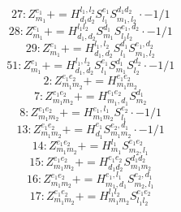 \documentclass[letterpaper,10pt,fleqn,leqno,onecolumn]{article}
\begin{document}
\begin{equation} \;\;\;\;\;\;  27: Z^{e_{1}}_{m_{1}}+=H^{l_{1},l_{2}}_{d_{1}d_{2}}S^{e_{1}}_{l_{1}}S^{d_{1}d_{2}}_{m_{1},l_{2}}\cdot -1/1 \end{equation}
\begin{equation} \;\;\;\;\;\;  28: Z^{e_{1}}_{m_{1}}+=H^{l_{1}l_{2}}_{d_{1},d_{2}}S^{d_{1}}_{m_{1}}S^{e_{1},d_{2}}_{l_{1}l_{2}}\cdot -1/1 \end{equation}
\begin{equation} \;\;\;\;\;\;  29: Z^{e_{1}}_{m_{1}}+=H^{l_{1},l_{2}}_{d_{1},d_{2}}S^{d_{1}}_{l_{1}}S^{e_{1},d_{2}}_{m_{1},l_{2}} \end{equation}
\begin{equation} \;\;\;\;\;\;  51: Z^{e_{1}}_{m_{1}}+=H^{l_{1},l_{2}}_{d_{1},d_{2}}S^{e_{1}}_{l_{1}}S^{d_{1}}_{m_{1}}S^{d_{2}}_{l_{2}}\cdot -1/1 \end{equation}
\begin{equation} \;\;\;\;\;\;  2: Z^{e_{1}e_{2}}_{m_{1}m_{2}}+=H^{e_{1}e_{2}}_{m_{1}m_{2}} \end{equation}
\begin{equation} \;\;\;\;\;\;  7: Z^{e_{1}e_{2}}_{m_{1}m_{2}}+=H^{e_{1}e_{2}}_{m_{1},d_{1}}S^{d_{1}}_{m_{2}} \end{equation}
\begin{equation} \;\;\;\;\;\;  8: Z^{e_{1}e_{2}}_{m_{1}m_{2}}+=H^{e_{1},l_{1}}_{m_{1}m_{2}}S^{e_{2}}_{l_{1}}\cdot -1/1 \end{equation}
\begin{equation} \;\;\;\;\;\;  13: Z^{e_{1}e_{2}}_{m_{1}m_{2}}+=H^{e_{1}}_{d_{1}}S^{e_{2},d_{1}}_{m_{1}m_{2}}\cdot -1/1 \end{equation}
\begin{equation} \;\;\;\;\;\;  14: Z^{e_{1}e_{2}}_{m_{1}m_{2}}+=H^{l_{1}}_{m_{1}}S^{e_{1}e_{2}}_{m_{2},l_{1}} \end{equation}
\begin{equation} \;\;\;\;\;\;  15: Z^{e_{1}e_{2}}_{m_{1}m_{2}}+=H^{e_{1}e_{2}}_{d_{1}d_{2}}S^{d_{1}d_{2}}_{m_{1}m_{2}} \end{equation}
\begin{equation} \;\;\;\;\;\;  16: Z^{e_{1}e_{2}}_{m_{1}m_{2}}+=H^{e_{1},l_{1}}_{m_{1},d_{1}}S^{e_{2},d_{1}}_{m_{2},l_{1}} \end{equation}
\begin{equation} \;\;\;\;\;\;  17: Z^{e_{1}e_{2}}_{m_{1}m_{2}}+=H^{l_{1}l_{2}}_{m_{1}m_{2}}S^{e_{1}e_{2}}_{l_{1}l_{2}} \end{equation}
\end{document}
